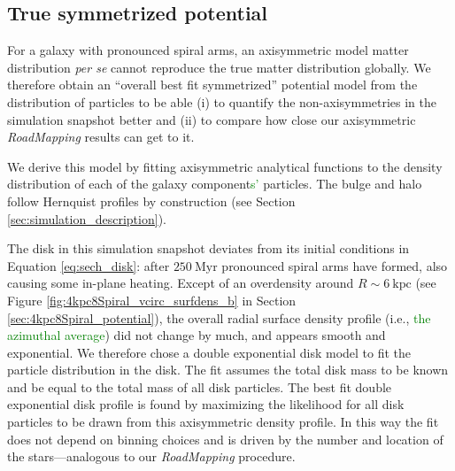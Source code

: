\documentclass[iop,revtex4,numberedappendix,appendixfloats]{emulateapj}
\newcommand{\RM}{{\sl RoadMapping}}
\newcommand{\NEW}[1]{\textcolor{Green}{#1}}
\newcommand{\OLD}[1]{}
\begin{document}
\subsection{True symmetrized potential} \label{sec:DEHH-Pot}

For a galaxy with pronounced spiral arms, an axisymmetric model matter distribution \emph{per se} cannot reproduce the true matter distribution globally. We therefore obtain an ``overall best fit symmetrized'' potential model from the distribution of particles to be able (i) to quantify the non-axisymmetries in the simulation snapshot better and (ii) to compare how close our axisymmetric \RM{} results can get to it. 

We derive this model by fitting axisymmetric analytical functions to the density distribution of each of the galaxy component\OLD{'s}\NEW{s'} particles. The bulge and halo follow Hernquist profiles by construction (see Section \ref{sec:simulation_description}).

The disk in this simulation snapshot deviates from its initial conditions in Equation \eqref{eq:sech_disk}: after $250~\text{Myr}$ pronounced spiral arms have formed, also causing some in-plane heating. Except of an overdensity around $R\sim6~\text{kpc}$ (see Figure \ref{fig:4kpc8Spiral_vcirc_surfdens_b} in Section \ref{sec:4kpc8Spiral_potential}), the overall radial surface density profile (i.e., \OLD{when averaging over the $\phi$ coordinate}\NEW{the azimuthal average}) did not change by much, and appears smooth and exponential. We therefore chose a double exponential disk model to fit the particle distribution in the disk. The fit assumes the total disk mass to be known and be equal to the total mass of all disk particles. The best fit double exponential disk profile is found by maximizing the likelihood for all disk particles to be drawn from this axisymmetric density profile. In this way the fit does not depend on binning choices and is driven by the number and location of the stars---analogous to our \RM{} procedure. 
\end{document}
